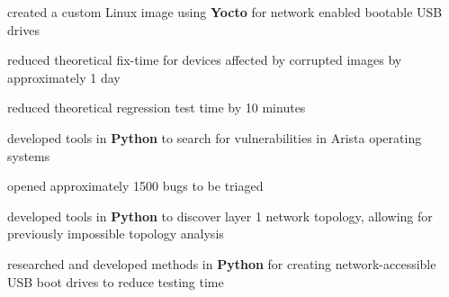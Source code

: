 \documentclass[a4paper]{style}
\begin{document}
\begin{minipage}[t]{0.54\textwidth}
\vspace{-1pt}
\begin{tightitemize}
    \item created a custom Linux image using \textbf{Yocto} for network enabled bootable USB drives
        \vspace{2pt}
        \begin{tightitemize}
            \item reduced theoretical fix-time for devices affected by corrupted images by approximately 1 day
            \item reduced theoretical regression test time by 10 minutes
        \end{tightitemize}
        \vspace{1pt}
    \item developed tools in \textbf{Python} to search for vulnerabilities in Arista operating systems
        \vspace{2pt}
        \begin{tightitemize}
            \item opened approximately 1500 bugs to be triaged
        \end{tightitemize}
\end{tightitemize}
\sectionspace{} %

\vspace{-1pt}
\begin{tightitemize}
    \item developed tools in \textbf{Python} to discover layer 1 network topology, allowing for previously impossible topology analysis
    \item researched and developed methods in \textbf{Python} for creating network-accessible USB boot drives to reduce testing time
\end{tightitemize}
\sectionspace{} %


\end{minipage}
\end{document}
